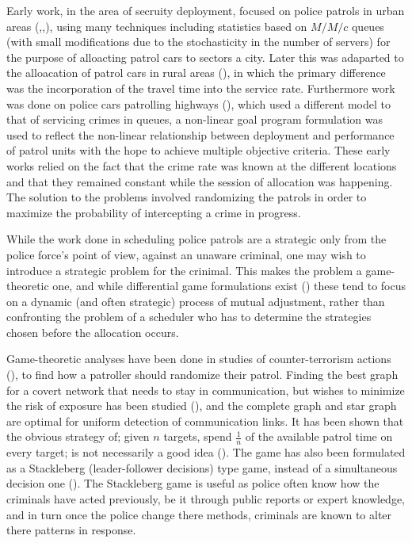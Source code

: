 \documentclass[a4paper,10pt]{article}
\theoremstyle{definition}
\theoremstyle{definition}
\theoremstyle{remark}
\theoremstyle{definition}
\begin{document}
Early work, in the area of secruity deployment, focused on police patrols in urban areas (\cite{Larson1972},\cite{Chelst1978},\cite{Chaiken1978}), using many techniques including statistics based on $M/M/c$ queues (with small modifications due to the stochasticity in the number of servers) for the purpose of alloacting patrol cars to sectors a city. Later this was adaparted to the alloacation of patrol cars in rural areas (\cite{Birge1989}), in which the primary difference was the incorporation of the travel time into the service rate. Furthermore work was done on police cars patrolling highways (\cite{Taylor1985}), which used a different model to that of servicing crimes in queues, a non-linear goal program formulation was used to reflect the non-linear relationship between deployment and performance of patrol units with the hope to achieve multiple objective criteria. These early works relied on the fact that the crime rate was known at the different locations and that they remained constant while the session of allocation was happening. The solution to the problems involved randomizing the patrols in order to maximize the probability of intercepting a crime in progress.

While the work done in scheduling police patrols are a strategic only from the police force's point of view, against an unaware criminal, one may wish to introduce a strategic problem for the crinimal. This makes the problem a game-theoretic one, and while differential game formulations exist (\cite{Feichtinger1983}) these tend to focus on a dynamic (and often strategic) process of mutual adjustment, rather than confronting the problem of a scheduler who has to determine the strategies chosen before the allocation occurs.

Game-theoretic analyses have been done in studies of counter-terrorism actions (\cite{Brown2006}), to find how a patroller should randomize their patrol. Finding the best graph for a covert network that needs to stay in communication, but wishes to minimize the risk of exposure has been studied (\cite{Lindelauf2009}), and the complete graph and star graph are optimal for uniform detection of communication links. It has been shown that the obvious strategy of; given $n$ targets, spend $\frac{1}{n}$ of the available patrol time on every target; is not necessarily a good idea (\cite{Fox}). The game has also been formulated as a Stackleberg (leader-follower decisions) type game, instead of a simultaneous decision one (\cite{Paruchuri2008}). The Stackleberg game is useful as police often know how the criminals have acted previously, be it through public reports or expert knowledge, and in turn once the police change there methods, criminals are known to alter there patterns in response.
\end{document}
